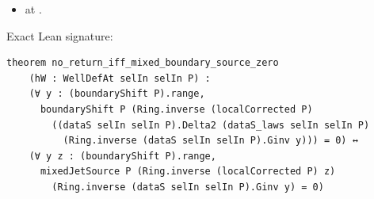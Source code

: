 \begin{theorem}[bp-023]
\begin{itemize}
\item \texttt{} at \texttt{}.
\end{itemize}
\par Exact Lean signature:
\begin{verbatim}
theorem no_return_iff_mixed_boundary_source_zero
    (hW : WellDefAt selIn selIn P) :
    (∀ y : (boundaryShift P).range,
      boundaryShift P (Ring.inverse (localCorrected P)
        ((dataS selIn selIn P).Delta2 (dataS_laws selIn selIn P)
          (Ring.inverse (dataS selIn selIn P).Ginv y))) = 0) ↔
    (∀ y z : (boundaryShift P).range,
      mixedJetSource P (Ring.inverse (localCorrected P) z)
        (Ring.inverse (dataS selIn selIn P).Ginv y) = 0)
\end{verbatim}
\end{theorem}

